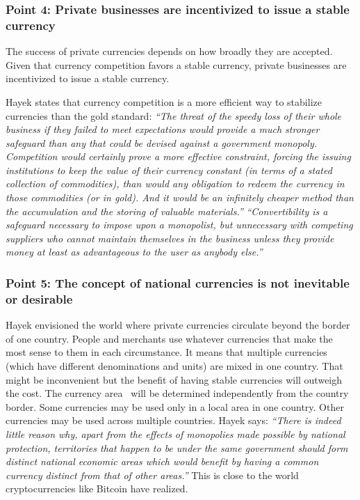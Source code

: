 \documentclass[dvipdfmx,a4paper]{article}
\begin{document}
\subsubsection{Point 4: Private businesses are incentivized to issue a stable currency}

The success of private currencies depends on how broadly they are accepted. Given that currency competition favors a stable currency, private businesses are incentivized to issue a stable currency.

Hayek states that currency competition is a more efficient way to stabilize currencies than the gold standard: \textit{``The threat of the speedy loss of their whole business if they failed to meet expectations would provide a much stronger safeguard than any that could be devised against a government monopoly. Competition would certainly prove a more effective constraint, forcing the issuing institutions to keep the value of their currency constant (in terms of a stated collection of commodities), than would any obligation to redeem the currency in those commodities (or in gold). And it would be an infinitely cheaper method than the accumulation and the storing of valuable materials.''} \textit{``Convertibility is a safeguard necessary to impose upon a monopolist, but unnecessary with competing suppliers who cannot maintain themselves in the business unless they provide money at least as advantageous to the user as anybody else.''}

\subsubsection{Point 5: The concept of national currencies is not inevitable or desirable}

Hayek envisioned the world where private currencies circulate beyond the border of one country. People and merchants use whatever currencies that make the most sense to them in each circumstance. It means that multiple currencies (which have different denominations and units) are mixed in one country. That might be inconvenient but the benefit of having stable currencies will outweigh the cost. The currency area~\cite{frankel1998endogenity} will be determined independently from the country border. Some currencies may be used only in a local area in one country. Other currencies may be used across multiple countries. Hayek says: \textit{``There is indeed little reason why, apart from the effects of monopolies made possible by national protection, territories that happen to be under the same government should form distinct national economic areas which would benefit by having a common currency distinct from that of other areas.''} This is close to the world cryptocurrencies like Bitcoin have realized.
\end{document}
